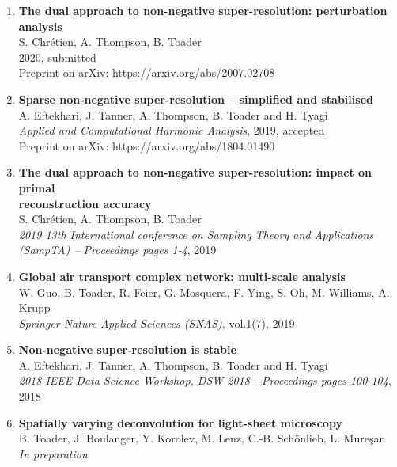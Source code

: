 \documentclass[10pt,a4paper,roman]{moderncv} %
\begin{document}
\begin{enumerate}

  \item
\textbf{The dual approach to non-negative super-resolution: 
  perturbation analysis}\\
S. Chrétien, A. Thompson, B. Toader\\
2020, submitted\\
Preprint on arXiv: https://arxiv.org/abs/2007.02708
\vspace{1em}

  \item
\textbf{Sparse non-negative super-resolution -- simplified and stabilised} \\
A. Eftekhari, J. Tanner, A. Thompson, B. Toader and H. Tyagi\\
{\em Applied and Computational Harmonic Analysis},
2019, accepted \\
Preprint on arXiv: https://arxiv.org/abs/1804.01490
\vspace{0.8em}

  \item
\textbf{The dual approach to non-negative super-resolution: 
  impact on primal\\ reconstruction accuracy}\\
S. Chrétien, A. Thompson, B. Toader\\
{\em 2019 13th International conference on Sampling Theory 
  and Applications (SampTA) -- Proceedings pages 1-4},
  2019
\vspace{0.8em}

  \item
\textbf{Global air transport complex network: multi-scale analysis}\\
W. Guo, B. Toader, R. Feier, G. Mosquera, F. Ying, S. Oh, M. Williams, A. Krupp\\
{\em Springer Nature Applied Sciences (SNAS)}, vol.1(7), 2019 
\vspace{0.8em}

  \item
\textbf{Non-negative super-resolution is stable} \\
A. Eftekhari, J. Tanner, A. Thompson, B. Toader and H. Tyagi\\
{\em 2018 IEEE Data Science Workshop, DSW 2018 - Proceedings pages 100-104},
2018 
\vspace{0.8em}
  
\item 
\textbf{Spatially varying deconvolution for light-sheet microscopy}\\
B. Toader, J. Boulanger, Y. Korolev, M. Lenz, C.-B. Schönlieb, L. Mureşan\\
{\em In preparation}
\vspace{1em}



\end{enumerate}
\end{document}
